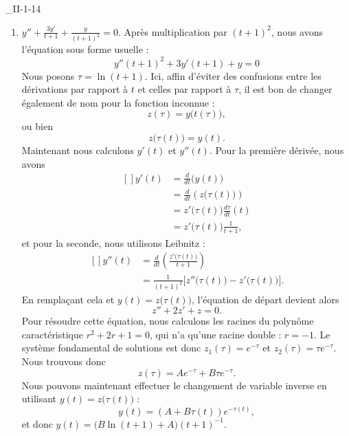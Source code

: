 \begin{corrige}{_II-1-14}

\begin{enumerate}

\item $y''+\frac{ 3y' }{ t+1 }+\frac{ y }{ (t+1)^2 }=0$.
Après multiplication par $(t+1)^2$, nous avons l'équation sous forme usuelle :
\begin{equation}	\label{EqEulerSSFormeII114}
	y''(t+1)^2+3y'(t+1)+y=0
\end{equation}
Nous posons $\tau=\ln(t+1)$. Ici, affin d'éviter des confusions entre les dérivations par rapport à $t$ et celles par rapport à $\tau$, il est bon de changer également de nom pour la fonction inconnue :
\begin{equation}
	z(\tau)=y\big( t(\tau) \big),
\end{equation}
ou bien
\begin{equation}
	z\big( \tau(t) \big)=y(t).
\end{equation}
Maintenant nous calculons $y'(t)$ et $y''(t)$. Pour la première dérivée, nous avons
\begin{equation}
	\begin{aligned}[]
	y'(t)	&=\frac{ d }{ dt }\big( y(t) \big)\\
		&=\frac{ d }{ dt }\left( z\big( \tau(t) \big) \right)\\
		&=z'\big( \tau(t) \big)\frac{ d\tau }{ dt }(t)\\
		&=z'\big( \tau(t) \big)\frac{ 1 }{ t+1 },
	\end{aligned}
\end{equation}
et pour la seconde, nous utilisons Leibnitz :
\begin{equation}
	\begin{aligned}[]
		y''(t)	&=\frac{ d }{ dt }\left( \frac{ z'\big( \tau(t) \big) }{ t+1 } \right)\\
			&=\frac{1}{ (t+1)^2 }\Big[  z''\big( \tau(t) \big)-z'\big( \tau(t) \big) \Big].
	\end{aligned}
\end{equation}
En remplaçant cela et $y(t)=z\big( \tau(t) \big)$, l'équation de départ devient alors
\begin{equation}
	z''+2z'+z=0.
\end{equation}
Pour résoudre cette équation, nous calculons les racines du polynôme caractéristique $r^2+2r+1=0$, qui n'a qu'une racine double : $r=-1$. Le système fondamental de solutions est donc $z_1(\tau)= e^{-\tau}$ et $z_2(\tau)= \tau e^{-\tau}$. Nous trouvons donc
\begin{equation}
	z(\tau)=A e^{-\tau}+B\tau e^{-\tau}.
\end{equation}
Nous pouvons maintenant effectuer le changement de variable inverse en utilisant $y(t)=z\big( \tau(t) \big)$ :
\begin{equation}
	y(t)=(A+B\tau(t)) e^{-\tau(t)},
\end{equation}
et donc $y(t)=\big( B\ln(t+1)+A \big)(t+1)^{-1}$.



\end{enumerate}
\end{corrige}
